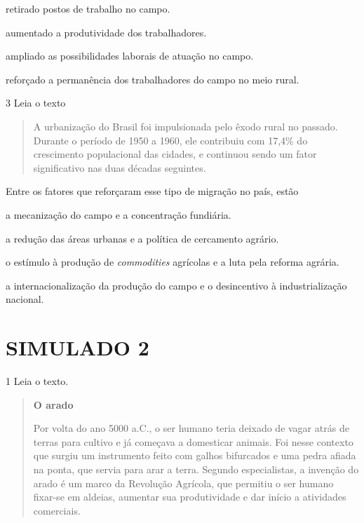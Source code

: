 \begin{escolha}
\item
  retirado postos de trabalho no campo.
\item
  aumentado a produtividade dos trabalhadores.
\item
  ampliado as possibilidades laborais de atuação no campo.
\item
  reforçado a permanência dos trabalhadores do campo no meio rural.
\end{escolha}

\num{3} Leia o texto

\begin{quote}
A urbanização do Brasil foi impulsionada pelo êxodo rural no passado.
Durante o período de 1950 a 1960, ele contribuiu com 17,4\% do
crescimento populacional das cidades, e continuou sendo um fator
significativo nas duas décadas seguintes.

\end{quote}

Entre os fatores que reforçaram esse tipo de migração no país, estão

\begin{escolha}
\item
  a mecanização do campo e a concentração fundiária.
\item
  a redução das áreas urbanas e a política de cercamento agrário.
\item
  o estímulo à produção de \emph{commodities} agrícolas e a luta pela
  reforma agrária.
\item
  a internacionalização da produção do campo e o desincentivo à
  industrialização nacional.
\end{escolha}


\chapter{SIMULADO 2}

\num{1} Leia o texto.

\begin{quote}
\textbf{O arado}

Por volta do ano 5000 a.C., o ser humano
teria deixado de vagar atrás de terras
para cultivo e já começava a domesticar
animais. Foi nesse contexto que surgiu um
instrumento feito com galhos bifurcados e
uma pedra afiada na ponta, que servia
para arar a terra. Segundo especialistas,
a invenção do arado é um marco da Revolução Agrícola, que permitiu o ser humano fixar-se em aldeias, aumentar sua produtividade e dar início a atividades comerciais.

\end{quote}

